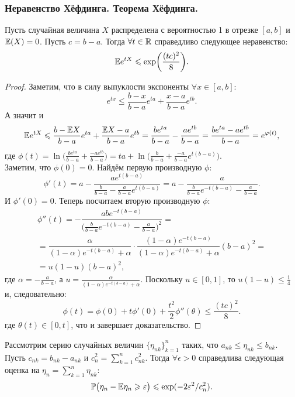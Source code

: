 \subsubsection{Неравенство Хёфдинга. Теорема Хёфдинга.}
\begin{lemma}
    Пусть случайная величина $X$ распределена с вероятностью 1 в отрезке $[a, b]$ и $\mathbb{E}(X) = 0$. Пусть $c = b - a$. Тогда $\forall t \in \mathbb{R}$ справедливо следующее неравенство:
    \[
        \mathbb{E} e^{tX} \leqslant \exp\biggr({\frac{(tc)^2}{8}}\biggr).
    \]
\end{lemma}
\begin{proof}
    Заметим, что в силу выпуклости экспоненты $\forall x \in [a, b]$:
    \[
        e^{tx} \leq \dfrac{b - x}{b - a}e^{ta} + \dfrac{x- a}{b- a}e^{tb}.
    \]
    А значит и 
    \[
        \mathbb{E} e^{tX} \leqslant \dfrac{b - \mathbb{E} X}{b - a}e^{ta} + \dfrac{\mathbb{E} X - a}{b - a}e^{tb} = \dfrac{be^{ta}}{b - a} - \dfrac{ae^{tb}}{b - a} = \dfrac{be^{ta} - ae^{tb}}{b - a} = e^{\varphi(t)},
    \]
    где $\phi(t) = \ln\biggr(\frac{be^{ta}}{b - a} + \frac{-ae^{tb}}{b - a}\biggr) = ta + \ln\biggr(\frac{b}{b - a} + \frac{-a}{b - a}e^{t(b - a)}\biggr)$. \\ Заметим, что $\phi(0) = 0$. Найдём первую производную $\phi$:
    \[
        \phi'(t) = a - \dfrac{ae^{t(b - a)}}{\frac{b}{b - a} - \frac{a}{b - a}e^{t(b - a)}} = a - \dfrac{a}{\frac{b}{b - a}e^{-t(b - a)} - \frac{a}{b - a}}.
    \]
    И $\phi'(0) = 0$. Теперь посчитаем вторую производную $\phi$:
    \begin{multline*}
        \phi''(t) = -\dfrac{abe^{-t(b - a)}}{\big(\frac{b}{b - a}e^{-t(b - a)} - \frac{a}{b - a}\big)^2} = \\ = \dfrac{\alpha}{(1 - \alpha)e^{-t(b - a)} + \alpha} \cdot \dfrac{(1 - \alpha)e^{-t(b - a)}}{(1 - \alpha)e^{-t(b - a)} + \alpha}(b - a)^2 = \\ = u(1 - u)(b - a)^2,
    \end{multline*}
    где $\alpha = -\frac{a}{b - a}$, а $u = \frac{\alpha}{(1 - \alpha)e^{-t(b - a)} + \alpha}$. Поскольку $u \in [0, 1]$, то $u(1 - u) \leq \frac{1}{4}$ и, следовательно:
    \[
        \phi(t) = \phi(0) + t\phi'(0) + \dfrac{t^2}{2}\phi''(\theta) \leq \dfrac{(tc)^2}{8}.
    \]
    где $\theta(t) \in [0, t]$, что и завершает доказательство.
\end{proof}
\begin{theorem}
    Рассмотрим серию случайных величин $\{\eta_{nk}\}_{k = 1}^n$ таких, что $a_{nk} \leq \eta_{nk} \leq b_{nk}$. Пусть $c_{nk} = b_{nk} - a_{nk}$ и $c_n^2 = \sum_{k = 1}^n c_{nk}^2$. Тогда $\forall \epsilon > 0$ справедлива следующая оценка на $\eta_n = \sum_{k = 1}^n \eta_{nk}$:
    \[
        \mathbb{P}\bigr(\eta_n - \mathbb{E}\eta_n \geqslant \varepsilon\bigr) \leqslant \exp({-{2\varepsilon^2}/{c_n^2}}).
    \]
\end{theorem}

